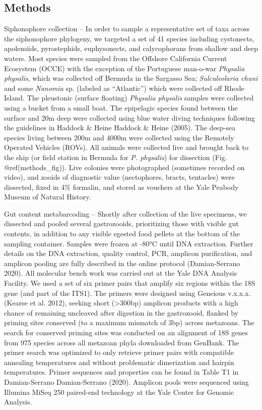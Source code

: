 \documentclass[12pt,]{article}
\begin{document}
\hypertarget{methods}{%
\subsection*{Methods}\label{methods}}

Siphonophore collection -- In order to sample a representative set of taxa across the siphonophore phylogeny, we targeted a set of 41 species including cystonects, apolemiids, pyrostephids, euphysonects, and calycophorans from shallow and deep waters. Most species were sampled from the Offshore California Current Ecosystem (OCCE) with the exception of the Portuguese man-o-war \emph{Physalia physalis}, which was collected off Bermuda in the Sargasso Sea; \emph{Sulculeolaria chuni} and some \emph{Nanomia} sp. (labeled as ``Atlantic'') which were collected off Rhode Island. The pleustonic (surface floating) \emph{Physalia physalis} samples were collected using a bucket from a small boat. The epipelagic species found between the surface and 20m deep were collected using blue water diving techniques following the guidelines in Haddock \& Heine Haddock \& Heine (2005). The deep-sea species living between 200m and 4000m were collected using the Remotely Operated Vehicles (ROVs). All animals were collected live and brought back to the ship (or field station in Bermuda for \emph{P. physalis}) for dissection (Fig. @ref(methods\_fig)). Live colonies were photographed (sometimes recorded on video), and zooids of diagnostic value (nectophores, bracts, tentacles) were dissected, fixed in 4\% formalin, and stored as vouchers at the Yale Peabody Museum of Natural History.

Gut content metabarcoding -- Shortly after collection of the live specimens, we dissected and pooled several gastrozooids, prioritizing those with visible gut contents, in addition to any visible egested food pellets at the bottom of the sampling container. Samples were frozen at -80°C until DNA extraction. Further details on the DNA extraction, quality control, PCR, amplicon purification, and amplicon pooling are fully described in the online protocol (Damian-Serrano 2020). All molecular bench work was carried out at the Yale DNA Analysis Facility. We used a set of six primer pairs that amplify six regions within the 18S gene (and part of the ITS1). The primers were designed using Geneious v.x.x.x. (Kearse et al. 2012), seeking short (\textgreater{}300bp) amplicon products with a high chance of remaining uncleaved after digestion in the gastrozooid, flanked by priming sites conserved (to a maximum mismatch of 3bp) across metazoans. The search for conserved priming sites was conducted on an alignment of 18S genes from 975 species across all metazoan phyla downloaded from GenBank. The primer search was optimized to only retrieve primer pairs with compatible annealing temperatures and without problematic dimerization and hairpin temperatures. Primer sequences and properties can be found in Table T1 in Damian-Serrano Damian-Serrano (2020). Amplicon pools were sequenced using Illumina MiSeq 250 paired-end technology at the Yale Center for Genomic Analysis.
\end{document}
